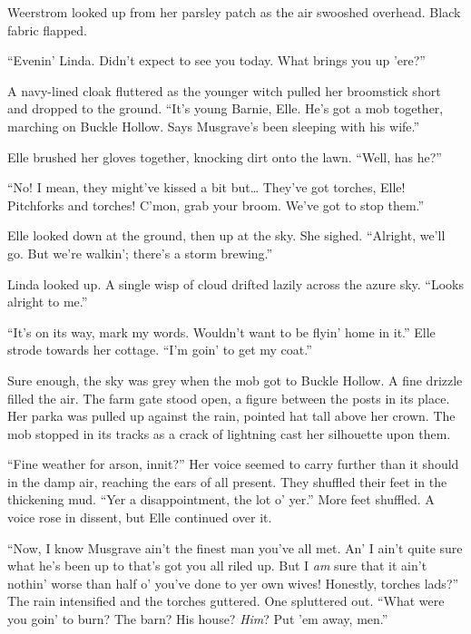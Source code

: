 
 Weerstrom looked up from her parsley patch as the air swooshed overhead.
Black fabric flapped.

``Evenin' Linda.
Didn't expect to see you today.
What brings you up 'ere?''

A navy-lined cloak fluttered as the younger witch pulled her broomstick short and dropped to the ground.
``It's young Barnie, Elle.
He's got a mob together, marching on Buckle Hollow.
Says Musgrave's been sleeping with his wife.''

Elle brushed her gloves together, knocking dirt onto the lawn.
``Well, has he?''

``No!
I mean, they might've kissed a bit but{\dots}
They've got torches, Elle!
Pitchforks and torches!
C'mon, grab your broom.
We've got to stop them.''

Elle looked down at the ground, then up at the sky.
She sighed.
``Alright, we'll go.
But we're walkin'; there's a storm brewing.''

Linda looked up.
A single wisp of cloud drifted lazily across the azure sky.
``Looks alright to me.''

``It's on its way, mark my words.
Wouldn't want to be flyin' home in it.''
Elle strode towards her cottage.
``I'm goin' to get my coat.''

\storybreak

Sure enough, the sky was grey when the mob got to Buckle Hollow.
A fine drizzle filled the air.
The farm gate stood open, a figure between the posts in its place.
Her parka was pulled up against the rain, pointed hat tall above her crown.
The mob stopped in its tracks as a crack of lightning cast her silhouette upon them.


``Fine weather for arson, innit?''
Her voice seemed to carry further than it should in the damp air, reaching the ears of all present.
They shuffled their feet in the thickening mud.
``Yer a disappointment, the lot o' yer.''
More feet shuffled.
A voice rose in dissent, but Elle continued over it.

``Now, I know Musgrave ain't the finest man you've all met.
An' I ain't quite sure what he's been up to that's got you all riled up.
But I \emph{am} sure that it ain't nothin' worse than half o' you've done to yer own wives!
Honestly, torches lads?''
The rain intensified and the torches guttered.
One spluttered out.
``What were you goin' to burn?
The barn?
His house?
\emph{Him}?
Put 'em away, men.''

